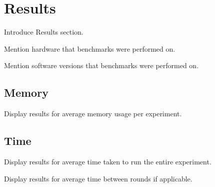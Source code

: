 \section{Results}

Introduce Results section.

Mention hardware that benchmarks were performed on.

Mention software versions that benchmarks were performed on.



\subsection{Memory}

Display results for average memory usage per experiment.

\subsection{Time}

Display results for average time taken to run the entire experiment.

Display results for average time between rounds if applicable.


